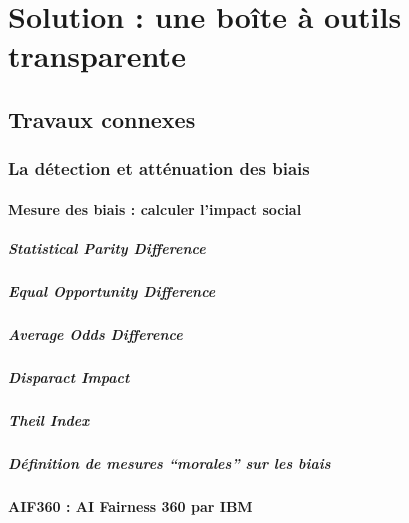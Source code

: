 \documentclass[10pt, french, a4paper]{report}
\begin{document}
\newpage
\chapter{Solution : une boîte à outils transparente}

\section{Travaux connexes}

\subsection{La détection et atténuation des biais}

\subsubsection{Mesure des biais : calculer l'impact social}

\paragraph{Statistical Parity Difference}

\paragraph{Equal Opportunity Difference}

\paragraph{Average Odds Difference}

\paragraph{Disparact Impact}

\paragraph{Theil Index}

\paragraph{Définition de mesures ``morales'' sur les biais}

\subsubsection{AIF360 : AI Fairness 360 par IBM}
\end{document}
